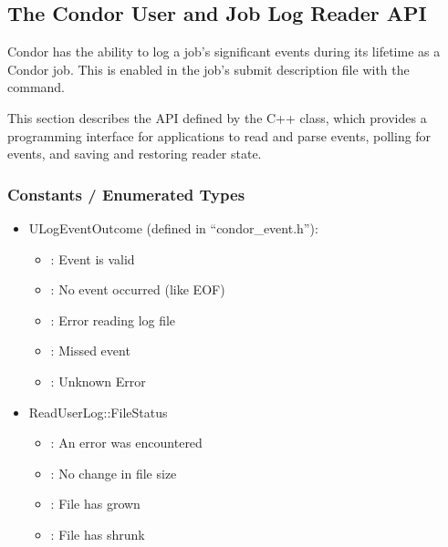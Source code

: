\subsection{\label{sec:job-log-reader}The Condor User and Job Log Reader API}

Condor has the ability to log a job's significant events during its lifetime as
a Condor job.  
This is enabled in the job's submit description file with the
 command.

This section describes the API defined by the C++  class,
which provides a programming interface for applications
to read and parse events,
polling for events, and saving and restoring reader state.

\subsubsection{Constants / Enumerated Types}
\begin{itemize}

\item ULogEventOutcome (defined in ``condor\_event.h''):
  \begin{itemize}
    \item {}: Event is valid
    \item {}: No event occurred (like EOF)
    \item {}: Error reading log file
    \item {}: Missed event
    \item {}: Unknown Error
  \end{itemize}

\item ReadUserLog::FileStatus
  \begin{itemize}
    \item {}: An error was encountered
    \item {}: No change in file size
    \item {}: File has grown
    \item {}: File has shrunk
  \end{itemize}

\end{itemize}


